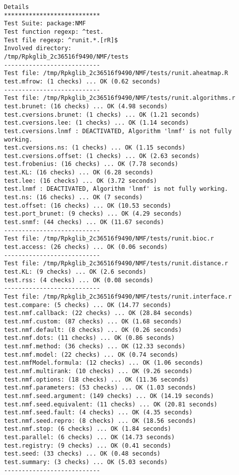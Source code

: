 \documentclass[10pt]{article}\usepackage[]{graphicx}\usepackage[]{color}
\begin{document}
\begin{verbatim}
Details 
*************************** 
Test Suite: package:NMF 
Test function regexp: ^test. 
Test file regexp: ^runit.*.[rR]$ 
Involved directory: 
/tmp/Rpkglib_2c36516f9490/NMF/tests 
--------------------------- 
Test file: /tmp/Rpkglib_2c36516f9490/NMF/tests/runit.aheatmap.R 
test.mfrow: (1 checks) ... OK (0.62 seconds)
--------------------------- 
Test file: /tmp/Rpkglib_2c36516f9490/NMF/tests/runit.algorithms.r 
test.brunet: (16 checks) ... OK (4.98 seconds)
test.cversions.brunet: (1 checks) ... OK (1.21 seconds)
test.cversions.lee: (1 checks) ... OK (1.14 seconds)
test.cversions.lnmf : DEACTIVATED, Algorithm 'lnmf' is not fully working.
test.cversions.ns: (1 checks) ... OK (1.15 seconds)
test.cversions.offset: (1 checks) ... OK (2.63 seconds)
test.frobenius: (16 checks) ... OK (7.78 seconds)
test.KL: (16 checks) ... OK (6.28 seconds)
test.lee: (16 checks) ... OK (3.72 seconds)
test.lnmf : DEACTIVATED, Algorithm 'lnmf' is not fully working.
test.ns: (16 checks) ... OK (7 seconds)
test.offset: (16 checks) ... OK (10.53 seconds)
test.port_brunet: (9 checks) ... OK (4.29 seconds)
test.snmf: (44 checks) ... OK (11.67 seconds)
--------------------------- 
Test file: /tmp/Rpkglib_2c36516f9490/NMF/tests/runit.bioc.r 
test.access: (26 checks) ... OK (0.06 seconds)
--------------------------- 
Test file: /tmp/Rpkglib_2c36516f9490/NMF/tests/runit.distance.r 
test.KL: (9 checks) ... OK (2.6 seconds)
test.rss: (4 checks) ... OK (0.08 seconds)
--------------------------- 
Test file: /tmp/Rpkglib_2c36516f9490/NMF/tests/runit.interface.r 
test.compare: (5 checks) ... OK (14.77 seconds)
test.nmf.callback: (22 checks) ... OK (28.84 seconds)
test.nmf.custom: (87 checks) ... OK (1.68 seconds)
test.nmf.default: (8 checks) ... OK (0.26 seconds)
test.nmf.dots: (11 checks) ... OK (0.86 seconds)
test.nmf.method: (36 checks) ... OK (12.33 seconds)
test.nmf.model: (22 checks) ... OK (0.74 seconds)
test.nmfModel.formula: (12 checks) ... OK (1.06 seconds)
test.nmf.multirank: (10 checks) ... OK (9.26 seconds)
test.nmf.options: (18 checks) ... OK (11.36 seconds)
test.nmf.parameters: (53 checks) ... OK (1.03 seconds)
test.nmf.seed.argument: (149 checks) ... OK (14.19 seconds)
test.nmf.seed.equivalent: (11 checks) ... OK (20.81 seconds)
test.nmf.seed.fault: (4 checks) ... OK (4.35 seconds)
test.nmf.seed.repro: (8 checks) ... OK (18.56 seconds)
test.nmf.stop: (6 checks) ... OK (1.84 seconds)
test.parallel: (6 checks) ... OK (14.73 seconds)
test.registry: (9 checks) ... OK (0.41 seconds)
test.seed: (33 checks) ... OK (0.48 seconds)
test.summary: (3 checks) ... OK (5.03 seconds)
--------------------------- 

\end{verbatim}
\end{document}
